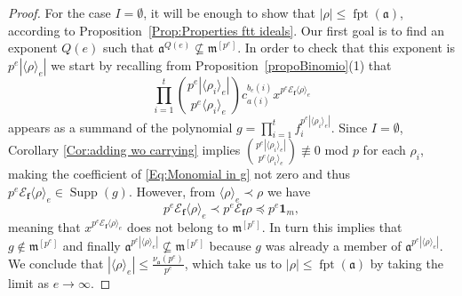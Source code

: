 \documentclass[12pt]{amsart}
\theoremstyle{definition}
\numberwithin{equation}{subsection}
\DeclareMathOperator{\fpt}{fpt}
\newcommand{\m}{\mathfrak{m}}
\newcommand{\fa}{\mathfrak{a}}
\newcommand{\Bf}{\boldsymbol{f}}
\newcommand{\E}{\mathcal{E}}
\newcommand{\Supp}{\operatorname{Supp}}
\renewcommand{\!}[1]{{\color{red}\text{\Huge$\star$ }#1}}
\begin{document}
\begin{proof}
	For the case $I= \emptyset$, it will be enough to show that $|\rho| \leq \fpt(\fa)$, according to Proposition~\ref{Prop:Properties ftt ideals}. Our first goal is to find an exponent $Q(e)$ such that $\fa^{Q(e)} \nsubseteq  \m^{[p^{e}]}$. In order to check that this exponent is $p^{e} |\langle \rho \rangle_e|$ we start by recalling from Proposition~\ref{propoBinomio}(1) that
	\begin{equation}\label{Eq:Monomial in g}
		\prod_{i=1}^{t}\binom{p^{e}|\langle \rho_i \rangle_e|}{p^{e}\langle \rho_i \rangle_e}c_{a(i)}^{b_{e}(i)}x^{p^{e}\E_{\Bf} \langle \rho \rangle_e}
	\end{equation}
	appears as a summand of the polynomial  $g=\prod_{i=1}^{t} f_i^{p^{e}|\langle \rho_i \rangle_e|}$. Since $I=\emptyset$,  Corollary \ref{Cor:adding wo carrying} implies $\binom{p^{e}|\langle \rho_i \rangle_e|}{p^{e}\langle \rho_i \rangle_e} \not \equiv 0$ mod $p$ for each $\rho_i$, making the coefficient of \eqref{Eq:Monomial in g} not zero and thus $p^{e}\E_{\Bf} \langle \rho \rangle_e \in \Supp(g)$. However, from $\langle \rho \rangle_e \prec \rho$ we have 
	\[p^{e}\E_{\Bf} \langle \rho \rangle_e \prec p^{e}\E_{\Bf} \rho \preceq p^{e}\textbf{1}_m,
	\]
	meaning that  $x^{p^{e}\E_{\Bf} \langle \rho \rangle_e}$ does not belong to 
	 $\m^{[p^{e}]}$. In turn this implies that $g \notin \m^{[p^{e}]}$ and finally $\fa^{p^{e} |\langle \rho \rangle_e|} \nsubseteq  \m^{[p^{e}]}$ because $g$ was already a member of $\fa^{p^{e}|\langle \rho \rangle_e|}$. We conclude that $|\langle \rho \rangle_e| \leq \frac{\nu_{\fa}(p^{e})}{p^{e}}$, which take us to $|\rho| \leq \fpt(\fa)$ by taking the limit as $e \to \infty$.
	

\end{proof}
\end{document}

